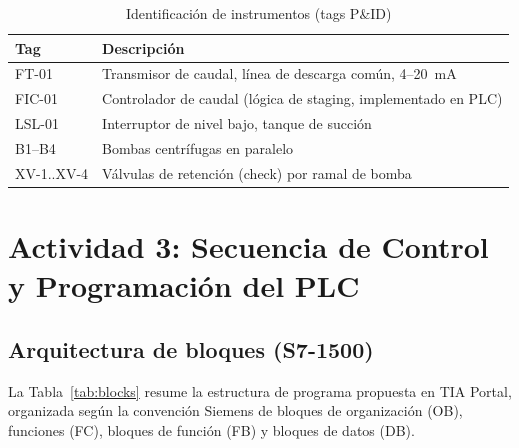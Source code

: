 \documentclass[conference]{IEEEtran}
\begin{document}
\begin{table}[H]
\centering
\caption{Identificación de instrumentos (tags P\&ID)}
\label{tab:tags}
\renewcommand{\arraystretch}{1.2}
\begin{tabular}{|l|p{5.6cm}|}
\hline
\textbf{Tag} & \textbf{Descripción} \\
\hline
FT-01 & Transmisor de caudal, línea de descarga común, 4--20~mA \\ \hline
FIC-01 & Controlador de caudal (lógica de staging, implementado en PLC) \\ \hline
LSL-01 & Interruptor de nivel bajo, tanque de succión \\ \hline
B1--B4 & Bombas centrífugas en paralelo \\ \hline
XV-1..XV-4 & Válvulas de retención (check) por ramal de bomba \\ \hline
\end{tabular}
\end{table}

\section{Actividad 3: Secuencia de Control y Programación del PLC}
\label{sec:plc}

\subsection{Arquitectura de bloques (S7-1500)}

La Tabla~\ref{tab:blocks} resume la estructura de programa propuesta en TIA Portal, organizada según la convención Siemens de bloques de organización (OB), funciones (FC), bloques de función (FB) y bloques de datos (DB).
\end{document}
